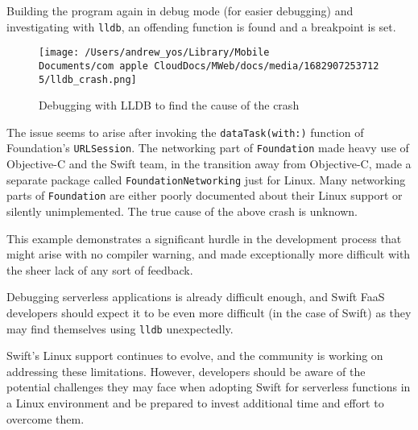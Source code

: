 Building the program again in debug mode (for easier debugging) and investigating with \texttt{lldb}, an offending function is found and a breakpoint is set.

\begin{figure}[h]
    \centering
    \texttt{[image: /Users/andrew\_yos/Library/Mobile Documents/com~apple~CloudDocs/MWeb/docs/media/16829072537125/lldb\_crash.png]}
    \caption{Debugging with LLDB to find the cause of the crash}
\end{figure}

The issue seems to arise after invoking the \texttt{dataTask(with:)} function of Foundation's \texttt{URLSession}. The networking part of \texttt{Foundation} made heavy use of Objective-C and the Swift team, in the transition away from Objective-C, made a separate package called \texttt{FoundationNetworking} just for Linux. Many networking parts of \texttt{Foundation} are either poorly documented about their Linux support or silently unimplemented. The true cause of the above crash is unknown.

This example demonstrates a significant hurdle in the development process that might arise with no compiler warning, and made exceptionally more difficult with the sheer lack of any sort of feedback.

Debugging serverless applications is already difficult enough, and Swift FaaS developers should expect it to be even more difficult (in the case of Swift) as they may find themselves using \texttt{lldb} unexpectedly.

Swift's Linux support continues to evolve, and the community is working on addressing these limitations. However, developers should be aware of the potential challenges they may face when adopting Swift for serverless functions in a Linux environment and be prepared to invest additional time and effort to overcome them.
    
